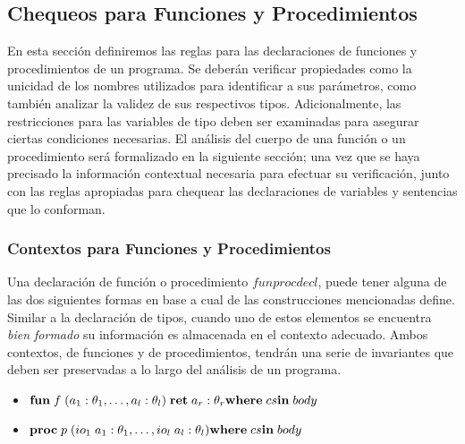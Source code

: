 \subsection{Chequeos para Funciones y Procedimientos}

En esta sección definiremos las reglas para las declaraciones de funciones y procedimientos de un programa.
Se deberán verificar propiedades como la unicidad de los nombres utilizados para identificar a sus parámetros, como también analizar la validez de sus respectivos tipos.
Adicionalmente, las restricciones para las variables de tipo deben ser examinadas para asegurar ciertas condiciones necesarias.
El análisis del cuerpo de una función o un procedimiento será formalizado en la siguiente sección; una vez que se haya precisado la información contextual necesaria para efectuar su verificación, junto con las reglas apropiadas para chequear las declaraciones de variables y sentencias que lo conforman.

\subsubsection{Contextos para Funciones y Procedimientos}

Una declaración de función o procedimiento $funprocdecl$, puede tener alguna de las dos siguientes formas en base a cual de las construcciones mencionadas define.
Similar a la declaración de tipos, cuando uno de estos elementos se encuentra \textit{bien formado} su información es almacenada en el contexto adecuado.
Ambos contextos, de funciones y de procedimientos, tendrán una serie de invariantes que deben ser preservadas a lo largo del análisis de un programa. 

\begin{itemize}
    \item
    $
    \mathbf{fun} \; f \; (a_1: \theta_1, \ldots, a_l: \theta_l) \; \mathbf{ret} \; a_r: \theta_r
    \\
    \mathbf{where} \; cs
    \\
    \mathbf{in} \; body
    $
    \item
    $
    \mathbf{proc} \; p \; (io_1 \; a_1: \theta_1, \ldots, io_l \; a_l: \theta_l)
    \\
    \mathbf{where} \; cs
    \\
    \mathbf{in} \; body
    $
\end{itemize}

